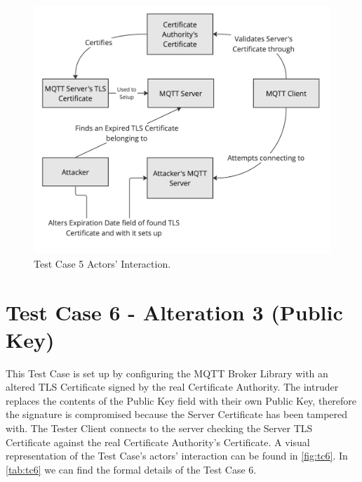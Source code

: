 \documentclass[binding=0.6cm,noexaminfo]{sapthesis}
\begin{document}
\begin{figure}[htb]
	\includegraphics[width=14cm]{TC5}
	\caption{Test Case 5 Actors' Interaction.}
	\label{fig:tc5}
\end{figure}

\section{Test Case 6 - Alteration 3 (Public Key)}
This Test Case is set up by configuring the MQTT Broker Library with an altered TLS Certificate signed by the real Certificate Authority. The intruder replaces the contents of the Public Key field with their own Public Key, therefore the signature is compromised because the Server Certificate has been tampered with. The Tester Client connects to the server checking the Server TLS Certificate against the real Certificate Authority’s Certificate. A visual representation of the Test Case's actors' interaction can be found in \autoref{fig:tc6}.  In \autoref{tab:tc6} we can find the formal details of the Test Case 6.
\end{document}
